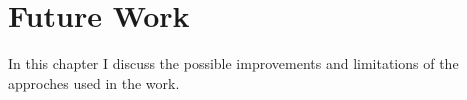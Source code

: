 \cleardoublepage

\chapter{Future Work}
\label{futureworkchapter}

In this chapter I discuss the possible improvements and limitations of the approches used in the work.